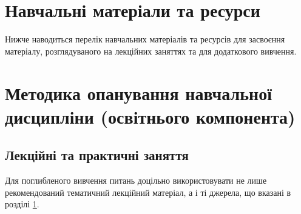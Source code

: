 \documentclass{Syllabus}
\begin{document}
\section{Навчальні матеріали та ресурси}\label{sec:refsec}

Нижче наводиться перелік навчальних матеріалів та ресурсів для засвоєння матеріалу, розглядуваного на лекційних заняттях та для додаткового вивчення.

\nocite{%
	AnisimovPlasma2018,
	SytenkoMalnev,
    zagorodny2014plasma,
	ZagorodnijMomot,
    ChenPlasma2016,
}

\printbibliography[category=Main, heading=subbibliography, title={Підручники та посібники}]

\printbibliography[category=Additional, heading=subbibliography, title={Додаткова}]

%

\newpage



\section{Методика опанування навчальної дисципліни (освітнього компонента)}


\subsection*{Лекційні та практичні заняття}

Для поглибленого вивчення питань доцільно використовувати не лише рекомендований тематичний лекційний матеріал, а і ті джерела, що вказані в розділі \ref{sec:refsec}.
\end{document}
